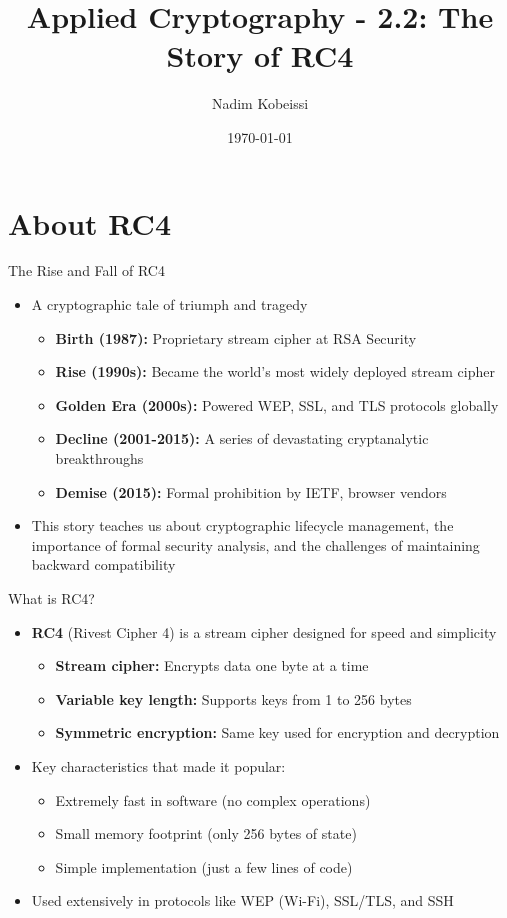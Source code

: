 \documentclass[aspectratio=169, lualatex, handout]{beamer}
\title{Applied Cryptography - 2.2: The Story of RC4}
\author{Nadim Kobeissi}
\institute{American University of Beirut}
\date{\today}
\begin{document}
\begin{frame}[plain]
	\titlepage
\end{frame}

\section{About RC4}

\begin{frame}{The Rise and Fall of RC4}
	\begin{itemize}
		\item A cryptographic tale of triumph and tragedy
		      \begin{itemize}
			      \item \textbf{Birth (1987):} Proprietary stream cipher at RSA Security
			      \item \textbf{Rise (1990s):} Became the world's most widely deployed stream cipher
			      \item \textbf{Golden Era (2000s):} Powered WEP, SSL, and TLS protocols globally
			      \item \textbf{Decline (2001-2015):} A series of devastating cryptanalytic breakthroughs
			      \item \textbf{Demise (2015):} Formal prohibition by IETF, browser vendors
		      \end{itemize}
		\item This story teaches us about cryptographic lifecycle management, the importance of formal security analysis, and the challenges of maintaining backward compatibility
	\end{itemize}
\end{frame}

\begin{frame}{What is RC4?}
	\begin{itemize}
		\item \textbf{RC4} (Rivest Cipher 4) is a stream cipher designed for speed and simplicity
		      \begin{itemize}
			      \item \textbf{Stream cipher:} Encrypts data one byte at a time
			      \item \textbf{Variable key length:} Supports keys from 1 to 256 bytes
			      \item \textbf{Symmetric encryption:} Same key used for encryption and decryption
		      \end{itemize}
		\item Key characteristics that made it popular:
		      \begin{itemize}
			      \item Extremely fast in software (no complex operations)
			      \item Small memory footprint (only 256 bytes of state)
			      \item Simple implementation (just a few lines of code)
		      \end{itemize}
		\item Used extensively in protocols like WEP (Wi-Fi), SSL/TLS, and SSH
	\end{itemize}
\end{frame}
\end{document}
